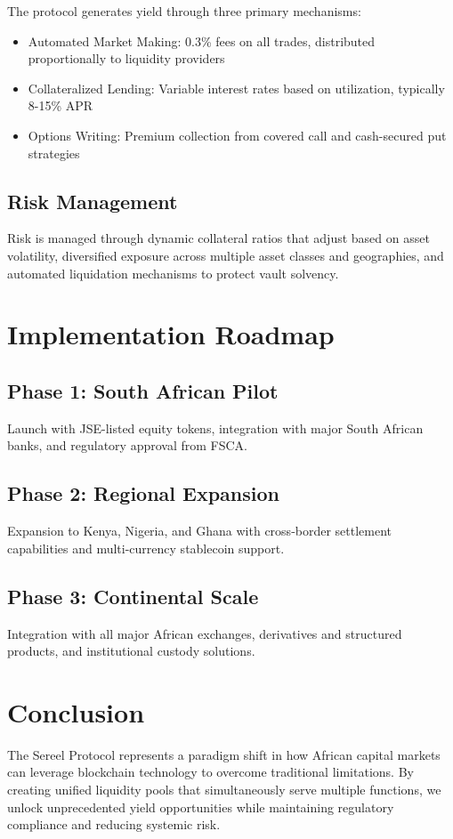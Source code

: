\documentclass[12pt]{article}
\begin{document}
The protocol generates yield through three primary mechanisms:

\begin{itemize}
  \item Automated Market Making: 0.3\% fees on all trades, distributed proportionally to liquidity providers
  \item Collateralized Lending: Variable interest rates based on utilization, typically 8-15\% APR
  \item Options Writing: Premium collection from covered call and cash-secured put strategies
\end{itemize}

\subsection{Risk Management}

Risk is managed through dynamic collateral ratios that adjust based on asset volatility, diversified exposure across multiple asset classes and geographies, and automated liquidation mechanisms to protect vault solvency.

\section{Implementation Roadmap}

\subsection{Phase 1: South African Pilot}
Launch with JSE-listed equity tokens, integration with major South African banks, and regulatory approval from FSCA.

\subsection{Phase 2: Regional Expansion}
Expansion to Kenya, Nigeria, and Ghana with cross-border settlement capabilities and multi-currency stablecoin support.

\subsection{Phase 3: Continental Scale}
Integration with all major African exchanges, derivatives and structured products, and institutional custody solutions.

\section{Conclusion}

The Sereel Protocol represents a paradigm shift in how African capital markets can leverage blockchain technology to overcome traditional limitations. By creating unified liquidity pools that simultaneously serve multiple functions, we unlock unprecedented yield opportunities while maintaining regulatory compliance and reducing systemic risk.
\end{document}

